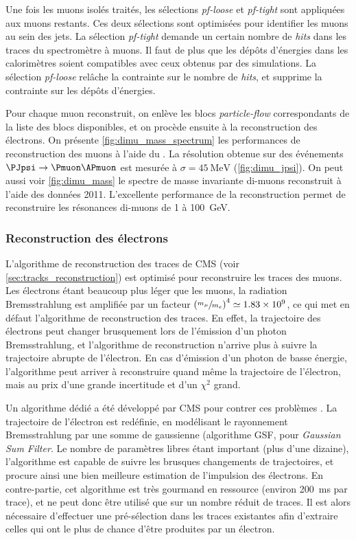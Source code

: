 Une fois les muons isolés traités, les sélections \emph{pf-loose} et \emph{pf-tight} sont appliquées aux muons restants. Ces deux sélections sont optimisées pour identifier les muons au sein des jets. La sélection \emph{pf-tight} demande un certain nombre de \emph{hits} dans les traces du spectromètre à muons. Il faut de plus que les dépôts d'énergies dans les calorimètres soient compatibles avec ceux obtenus par des simulations. La sélection \emph{pf-loose} relâche la contrainte sur le nombre de \emph{hits}, et supprime la contrainte sur les dépôts d'énergies.

Pour chaque muon reconstruit, on enlève les blocs \emph{particle-flow} correspondants de la liste des blocs disponibles, et on procède ensuite à la reconstruction des électrons. On présente \cref{fig:dimu_mass_spectrum} les performances de reconstruction des muons à l'aide du \pu. La résolution obtenue sur des événements $\PJpsi \rightarrow \Pmuon \APmuon$ est mesurée à $\sigma = \SI{45}{\MeV}$ (\cref{fig:dimu_jpsi}). On peut aussi voir \cref{fig:dimu_mass} le spectre de masse invariante di-muons reconstruit à l'aide des données 2011. L'excellente performance de la reconstruction permet de reconstruire les résonances di-muons de 1 à \SI{100}{\GeV}.

\subsubsection{Reconstruction des électrons}

L'algorithme de reconstruction des traces de CMS (voir \cref{sec:tracks_reconstruction}) est optimisé pour reconstruire les traces des muons. Les électrons étant beaucoup plus léger que les muons, la radiation Bremsstrahlung est amplifiée par un facteur $\left( \sfrac{m_\mu}{m_e} \right)^4 \simeq \num{1.83e9}$, ce qui met en défaut l'algorithme de reconstruction des traces. En effet, la trajectoire des électrons peut changer brusquement lors de l'émission d'un photon Bremsstrahlung, et l'algorithme de reconstruction n'arrive plus à suivre la trajectoire abrupte de l'électron. En cas d'émission d'un photon de basse énergie, l'algorithme peut arriver à reconstruire quand même la trajectoire de l'électron, mais au prix d'une grande incertitude et d'un $\chi^2$ grand.

Un algorithme dédié a été développé par CMS pour contrer ces problèmes \citep{pf,cms_pf_leptons,cms_pf_electrons}. La trajectoire de l'électron est redéfinie, en modélisant le rayonnement Bremsstrahlung par une somme de gaussienne (algorithme GSF, pour \emph{Gaussian Sum Filter}. Le nombre de paramètres libres étant important (plus d'une dizaine), l'algorithme est capable de suivre les brusques changements de trajectoires, et procure ainsi une bien meilleure estimation de l'impulsion des électrons. En contre-partie, cet algorithme est très gourmand en ressource (environ \SI{200}{\ms} par trace), et ne peut donc être utilisé que sur un nombre réduit de traces. Il est alors nécessaire d'effectuer une pré-sélection dans les traces existantes afin d'extraire celles qui ont le plus de chance d'être produites par un électron.

